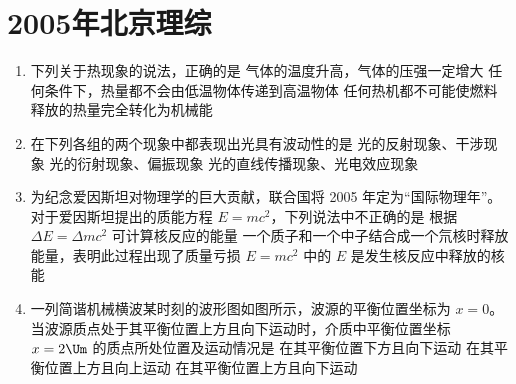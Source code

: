\documentclass[\gkver]{gaokaozhenti}
\begin{document}
\chapter{2005年北京理综}

\begin{enumerate}
\item
下列关于热现象的说法，正确的是
{气体的温度升高，气体的压强一定增大}
{任何条件下，热量都不会由低温物体传递到高温物体}
{任何热机都不可能使燃料释放的热量完全转化为机械能}

\item
在下列各组的两个现象中都表现出光具有波动性的是
{光的反射现象、干涉现象}
{光的衍射现象、偏振现象}
{光的直线传播现象、光电效应现象}

\item
为纪念爱因斯坦对物理学的巨大贡献，联合国将 2005 年定为“国际物理年”。对于爱因斯坦提出的质能方程 $E=mc^{2}$，下列说法中不正确的是
{根据 $\Delta E=\Delta mc^{2}$ 可计算核反应的能量}
{一个质子和一个中子结合成一个氘核时释放能量，表明此过程出现了质量亏损}
{$E=mc^{2}$ 中的 $E$ 是发生核反应中释放的核能}

\item
一列简谐机械横波某时刻的波形图如图所示，波源的平衡位置坐标为 $x=0$。当波源质点处于其平衡位置上方且向下运动时，介质中平衡位置坐标 $x=2\Um$ 的质点所处位置及运动情况是
{在其平衡位置下方且向下运动}
{在其平衡位置上方且向上运动}
{在其平衡位置上方且向下运动}


\end{enumerate}
\end{document}
